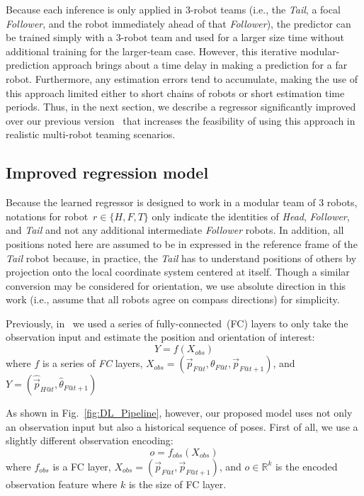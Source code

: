 \documentclass[letterpaper, 10 pt, conference]{ieeeconf}  %
\begin{document}
    Because each inference is only applied in 3-robot teams (i.e.,
    the \emph{Tail}, a focal \emph{Follower}, and the robot
    immediately ahead of that \emph{Follower}), the predictor can be
    trained simply with a $3$-robot team and used for a larger size time
    without additional training for the larger-team case.
    However, this iterative modular-prediction approach brings about a
    time delay in making a prediction for a far robot. Furthermore, any
    estimation errors tend to accumulate, making the use of this
    approach limited either to short chains of robots or short
    estimation time periods. Thus, in the next section, we describe a
    regressor significantly improved over our previous
    version~\cite{CPR17} that increases the feasibility of using this
    approach in realistic multi-robot teaming scenarios.

	\subsection{Improved regression model}
	\label{sec:regression_model}

    Because the learned regressor is designed to work in a modular team
    of $3$ robots, notations for robot~$r \in \{H, F, T\}$ only indicate
    the identities of \emph{Head}, \emph{Follower}, and \emph{Tail} and
    not any additional intermediate \emph{Follower} robots. In addition,
    all positions noted here are assumed to be in expressed in the
    reference frame of the \emph{Tail} robot because, in practice, the
    \emph{Tail} has to understand positions of others by projection onto
    the local coordinate system centered at itself. Though a similar
    conversion may be considered for orientation, we use absolute
    direction in this work (i.e., assume that all robots agree on
    compass directions) for simplicity.

	Previously, in~\cite{CPR17} we used a series of fully-connected~(FC) layers
	to only take the observation input and estimate the position and orientation
	of interest:
	\begin{equation}
	    Y = f(X_{obs})
	\end{equation}
    where $f$ is a series of \emph{FC} layers, $X_{obs} =
    (\vec{p}_{F@t}, \theta_{F@t}, \vec{p}_{F@t+1})$, and $Y =
    (\hat{\vec{p}}_{H@t}, \hat{\theta}_{F@t+1})$

	As shown in Fig.~\ref{fig:DL_Pipeline}, however, our proposed model uses not only
	an observation input but also a historical sequence of poses. First of all, we
	use a slightly different observation encoding:
	\begin{equation}
	    o = f_{obs}(X_{obs})
	\end{equation}
	where $f_{obs}$ is a FC layer,
	$X_{obs} = (\vec{p}_{F@t}, \vec{p}_{F@t+1})$,
	and $o \in \mathbb{R}^{k}$ is the encoded observation feature
	where $k$ is the size of FC layer.
\end{document}
